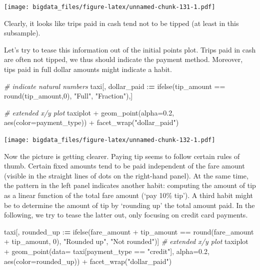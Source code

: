 \documentclass[
  12pt,
]{style/krantz}
\newenvironment{Shaded}{\begin{snugshade}}{\end{snugshade}}
\newcommand{\AttributeTok}[1]{\textcolor[rgb]{0.77,0.63,0.00}{#1}}
\newcommand{\CommentTok}[1]{\textcolor[rgb]{0.56,0.35,0.01}{\textit{#1}}}
\newcommand{\DecValTok}[1]{\textcolor[rgb]{0.00,0.00,0.81}{#1}}
\newcommand{\ErrorTok}[1]{\textcolor[rgb]{0.64,0.00,0.00}{\textbf{#1}}}
\newcommand{\FloatTok}[1]{\textcolor[rgb]{0.00,0.00,0.81}{#1}}
\newcommand{\FunctionTok}[1]{\textcolor[rgb]{0.00,0.00,0.00}{#1}}
\newcommand{\NormalTok}[1]{#1}
\newcommand{\SpecialCharTok}[1]{\textcolor[rgb]{0.00,0.00,0.00}{#1}}
\newcommand{\StringTok}[1]{\textcolor[rgb]{0.31,0.60,0.02}{#1}}
\begin{document}
\texttt{[image: bigdata\_files/figure-latex/unnamed-chunk-131-1.pdf]}

Clearly, it looks like trips paid in cash tend not to be tipped (at least in this subsample).

Let's try to tease this information out of the initial points plot. Trips paid in cash are often not tipped, we thus should indicate the payment method. Moreover, tips paid in full dollar amounts might indicate a habit.

\begin{Shaded}
\begin{Highlighting}[]
\CommentTok{\# indicate natural numbers}
\NormalTok{taxi[, dollar\_paid }\SpecialCharTok{:}\ErrorTok{=} \FunctionTok{ifelse}\NormalTok{(tip\_amount }\SpecialCharTok{==} \FunctionTok{round}\NormalTok{(tip\_amount,}\DecValTok{0}\NormalTok{), }\StringTok{"Full"}\NormalTok{, }\StringTok{"Fraction"}\NormalTok{),]}


\CommentTok{\# extended x/y plot}
\NormalTok{taxiplot }\SpecialCharTok{+}
     \FunctionTok{geom\_point}\NormalTok{(}\AttributeTok{alpha=}\FloatTok{0.2}\NormalTok{, }\FunctionTok{aes}\NormalTok{(}\AttributeTok{color=}\NormalTok{payment\_type)) }\SpecialCharTok{+}
     \FunctionTok{facet\_wrap}\NormalTok{(}\StringTok{"dollar\_paid"}\NormalTok{)}
\end{Highlighting}
\end{Shaded}

\texttt{[image: bigdata\_files/figure-latex/unnamed-chunk-132-1.pdf]}

Now the picture is getting clearer. Paying tip seems to follow certain rules of thumb. Certain fixed amounts tend to be paid independent of the fare amount (visible in the straight lines of dots on the right-hand panel). At the same time, the pattern in the left panel indicates another habit: computing the amount of tip as a linear function of the total fare amount (`pay 10\% tip'). A third habit might be to determine the amount of tip by `rounding up' the total amount paid. In the following, we try to tease the latter out, only focusing on credit card payments.

\begin{Shaded}
\begin{Highlighting}[]
\NormalTok{taxi[, rounded\_up }\SpecialCharTok{:}\ErrorTok{=} \FunctionTok{ifelse}\NormalTok{(fare\_amount }\SpecialCharTok{+}\NormalTok{ tip\_amount }\SpecialCharTok{==} \FunctionTok{round}\NormalTok{(fare\_amount }\SpecialCharTok{+}\NormalTok{ tip\_amount, }\DecValTok{0}\NormalTok{),}
                            \StringTok{"Rounded up"}\NormalTok{,}
                            \StringTok{"Not rounded"}\NormalTok{)]}
\CommentTok{\# extended x/y plot}
\NormalTok{taxiplot }\SpecialCharTok{+}
     \FunctionTok{geom\_point}\NormalTok{(}\AttributeTok{data=}\NormalTok{ taxi[payment\_type }\SpecialCharTok{==} \StringTok{"credit"}\NormalTok{],}
                \AttributeTok{alpha=}\FloatTok{0.2}\NormalTok{, }\FunctionTok{aes}\NormalTok{(}\AttributeTok{color=}\NormalTok{rounded\_up)) }\SpecialCharTok{+}
     \FunctionTok{facet\_wrap}\NormalTok{(}\StringTok{"dollar\_paid"}\NormalTok{)}
\end{Highlighting}
\end{Shaded}
\end{document}
